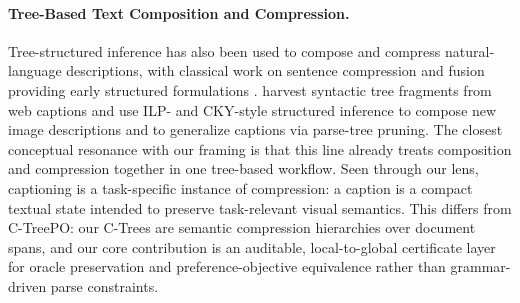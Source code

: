 \paragraph{Tree-Based Text Composition and Compression.}
Tree-structured inference has also been used to compose and compress natural-language descriptions, with classical work on sentence compression and fusion providing early structured formulations \citep{KnightMarcu2000SentenceCompression,BarzilayMcKeown2005SentenceFusion,ClarkeLapata2008ILPSentenceCompression}. \citet{KuznetsovaEtAl2014TreeTalk} harvest syntactic tree fragments from web captions and use ILP- and CKY-style structured inference to compose new image descriptions and to generalize captions via parse-tree pruning. The closest conceptual resonance with our framing is that this line already treats composition and compression together in one tree-based workflow. Seen through our lens, captioning is a task-specific instance of compression: a caption is a compact textual state intended to preserve task-relevant visual semantics. This differs from C-TreePO: our C-Trees are semantic compression hierarchies over document spans, and our core contribution is an auditable, local-to-global certificate layer for oracle preservation and preference-objective equivalence rather than grammar-driven parse constraints.
